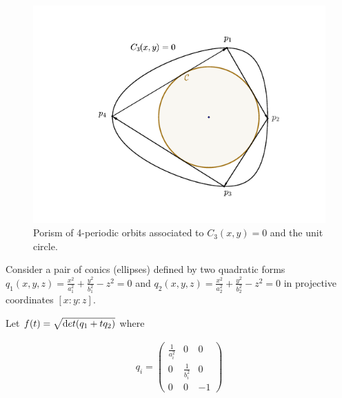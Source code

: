 \begin{figure}[H]
\begin{center}
\includegraphics[scale=0.8]{chap_02/pics/chap2-040-darbouxC3C2.pdf}
\end{center}
\caption{Porism of 4-periodic orbits associated to $C_3(x,y)=0$ and the unit circle. }
\label{fig:C3C2}
\end{figure}

Consider a pair of conics (ellipses) defined by two quadratic forms $q_1(x,y,z)=\frac{x^2}{a_1^2}+\frac{y^2}{b_1^2}-z^2=0$ and $q_2(x,y,z)=\frac{x^2}{a_2^2}+\frac{y^2}{b_2^2}-z^2=0$ in projective coordinates $[x:y:z]$.

Let $f(t)=\sqrt{{\text det} (q_1+tq_2)}$ where

\begin{align*}
 q_i= \left(\begin{matrix}\frac{1}{a_i^2} &0 &0 \\
0 &\frac{1}{b_i^2} &0\\
0 & 0 &-1
\end{matrix}\right)
\end{align*}
